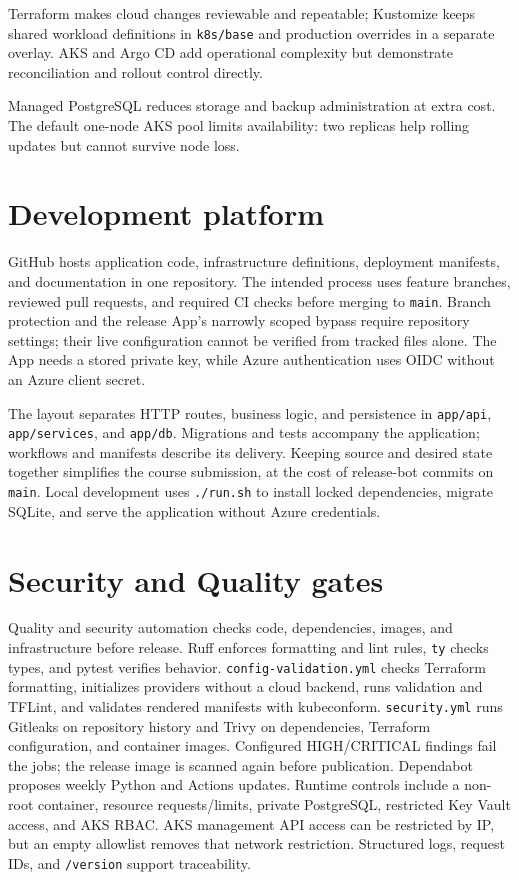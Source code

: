 \documentclass[10pt,a4paper]{article}
\newcommand{\file}[1]{\texttt{\nolinkurl{#1}}}
\begin{document}
Terraform makes cloud changes reviewable and repeatable; Kustomize keeps shared workload definitions in \file{k8s/base} and production overrides in a separate overlay. 
AKS and Argo CD add operational complexity but demonstrate reconciliation and rollout control directly. 

Managed PostgreSQL reduces storage and backup administration at extra cost.
The default one-node AKS pool limits availability: two replicas help rolling updates but cannot survive node loss. 


\section{Development platform}
GitHub hosts application code, infrastructure definitions, deployment manifests, and documentation in one repository.
The intended process uses feature branches, reviewed pull requests, and required CI checks before merging to \texttt{main}. 
Branch protection and the release App's narrowly scoped bypass require repository settings; their live configuration cannot be verified from tracked files alone.
The App needs a stored private key, while Azure authentication uses OIDC without an Azure client secret.

The layout separates HTTP routes, business logic, and persistence in \file{app/api}, \file{app/services}, and \file{app/db}. 
Migrations and tests accompany the application; workflows and manifests describe its delivery. 
Keeping source and desired state together simplifies the course submission, at the cost of release-bot commits on \texttt{main}.
 Local development uses \file{./run.sh} to install locked dependencies, migrate SQLite, and serve the application without Azure credentials.

\newpage
\section{Security and Quality gates}
Quality and security automation checks code, dependencies, images, and infrastructure before release. Ruff enforces formatting and lint rules, \texttt{ty} checks types, and pytest verifies behavior. \file{config-validation.yml} checks Terraform formatting, initializes providers without a cloud backend, runs validation and TFLint, and validates rendered manifests with kubeconform. \file{security.yml} runs Gitleaks on repository history and Trivy on dependencies, Terraform configuration, and container images. Configured HIGH/CRITICAL findings fail the jobs; the release image is scanned again before publication. Dependabot proposes weekly Python and Actions updates. Runtime controls include a non-root container, resource requests/limits, private PostgreSQL, restricted Key Vault access, and AKS RBAC. AKS management API access can be restricted by IP, but an empty allowlist removes that network restriction. Structured logs, request IDs, and \file{/version} support traceability.
\end{document}
